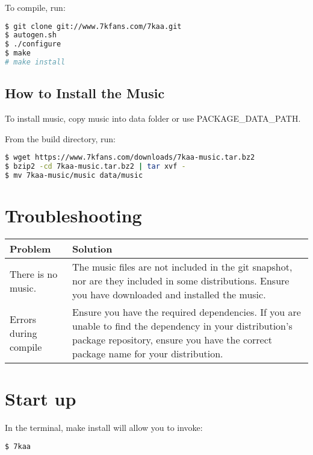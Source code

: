 To compile, run:

\begin{lstlisting}[language=bash]
$ git clone git://www.7kfans.com/7kaa.git
$ autogen.sh
$ ./configure
$ make
# make install
\end{lstlisting}


\subsection{How to Install the Music}

To install music, copy music into data folder or use PACKAGE\_DATA\_PATH.

From the build directory, run:

\begin{lstlisting}[language=bash]
$ wget https://www.7kfans.com/downloads/7kaa-music.tar.bz2
$ bzip2 -cd 7kaa-music.tar.bz2 | tar xvf -
$ mv 7kaa-music/music data/music
\end{lstlisting}

\section{Troubleshooting}

\begin{tabular}{ | l | p{6cm} |}
	\hline
	Problem	& Solution \\ \hline
There is no music. & The music files are not included in the git snapshot, nor are they included in some distributions. Ensure you have downloaded and installed the music. \\ \hline
Errors during compile & Ensure you have the required dependencies. If you are unable to find the dependency in your distribution's package repository, ensure you have the correct package name for your distribution. \\
 \hline
\end{tabular}

\section{Start up}

In the terminal, make install will allow you to invoke:

\begin{lstlisting}[language=bash]
$ 7kaa
\end{lstlisting}

